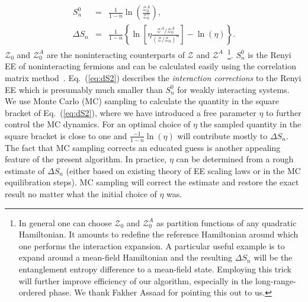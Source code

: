 \documentclass[twocolumn,english,prl,showpacs]{revtex4}
\begin{document}
\begin{eqnarray}
S_{n}^{0}  & =& \frac{1}{1-n} \ln\left(\frac{\mathcal{Z}_{0}^{A}}{\mathcal{Z}_{0}^{n}}\right), \\ 
\Delta S_{n} & = & \frac{1}{1-n} \left\{ \ln\left[\eta \frac{\mathcal{Z}^{A}/\mathcal{Z}_{0}^{A}}{ (\mathcal{Z}/ \mathcal{Z}_{0}  )^{n}}\right] - \ln(\eta) \right\}.    
\label{eq:dS2}
\end{eqnarray}
$\mathcal{Z}_{0}$ and $\mathcal{Z}_{0}^{A}$ are the noninteracting counterparts of $\mathcal{Z}$ and $\mathcal{Z}^{A}$~\footnote{In general one can choose $\mathcal{Z}_{0}$ and $\mathcal{Z}^{A}_{0}$ as partition functions of any quadratic Hamiltonian. It amounts to redefine the reference Hamiltonian around which one performs the interaction expansion. A particular useful example is to expand around a mean-field Hamiltonian and the resulting $\Delta S_{n}$ will be the entanglement entropy difference to a mean-field state. Employing this trick will further improve efficiency of our algorithm, especially in the long-range-ordered phase. We thank Fakher Assaad for pointing this out to us.}. $S_{n}^{0} $ is the Renyi EE of noninteracting fermions and can be calculated easily using the correlation matrix method~\cite{Peschel:2002gz, SM}. Eq.~(\ref{eq:dS2}) describes the \emph{interaction corrections} to the Renyi EE which is presumably much smaller than $S_{n}^{0}$ for weakly interacting systems. We use Monte Carlo (MC) sampling to calculate the quantity in the square bracket of Eq.~(\ref{eq:dS2}), where we have introduced a free parameter $\eta$ to further control the MC dynamics. For an optimal choice of $\eta$ the sampled quantity in the square bracket is close to one and  $\frac{-1}{1-n}\ln(\eta)$ will contribute mostly to $\Delta S_{n}$. The fact that MC sampling corrects an educated guess is another appealing feature of the present algorithm. In practice, $\eta$ can be determined from a rough estimate of $\Delta S_{n}$ (either based on existing theory of EE scaling laws or in the MC equilibration steps). MC sampling will correct the estimate and restore the exact result no matter what the initial choice of $\eta$ was. 
\end{document}

